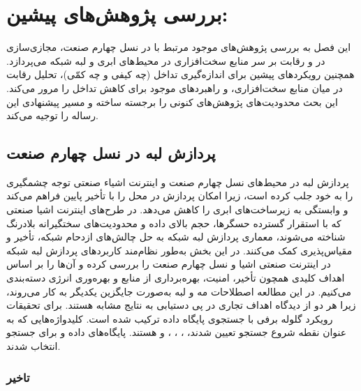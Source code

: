 
\chapter{بررسی پژوهش‌های پیشین:}\label{chap:litr}

این فصل به بررسی پژوهش‌های موجود مرتبط با  در نسل چهارم صنعت، مجازی‌سازی در  و رقابت بر سر منابع سخت‌افزاری در محیط‌های ابری و لبه‌ شبکه می‌پردازد. همچنین رویکردهای پیشین برای اندازه‌گیری تداخل (چه کیفی و چه کمّی)، تحلیل رقابت در میان منابع سخت‌افزاری، و راهبردهای موجود برای کاهش تداخل را مرور می‌کند. این بحث محدودیت‌های پژوهش‌های کنونی را برجسته ساخته و مسیر پیشنهادی این رساله را توجیه می‌کند.

\section{پردازش لبه در نسل چهارم صنعت}

پردازش لبه در محیط‌های نسل چهارم صنعت و اینترنت اشیاء صنعتی توجه چشمگیری را به خود جلب کرده است، زیرا امکان پردازش در محل را با تأخیر پایین فراهم می‌کند و وابستگی به زیرساخت‌های ابری را کاهش می‌دهد. در طرح‌های اینترنت اشیا صنعتی که با استقرار گسترده حسگرها، حجم بالای داده و محدودیت‌های سختگیرانه بلادرنگ شناخته می‌شوند، معماری پردازش لبه شبکه به حل چالش‌های ازدحام شبکه، تأخیر و مقیاس‌پذیری کمک می‌کنند. در این بخش به‌طور نظام‌مند کاربردهای پردازش لبه شبکه در اینترنت صنعتی اشیا و نسل چهارم صنعت را بررسی کرده و آن‌ها را بر اساس اهداف کلیدی همچون تأخیر، امنیت، بهره‌برداری از منابع و بهره‌وری انرژی دسته‌بندی می‌کنیم. در این مطالعه اصطلاحات مه  و لبه  به‌صورت جایگزین یکدیگر به کار می‌روند، زیرا هر دو از دیدگاه اهداف تجاری در پی دستیابی به نتایج مشابه هستند. برای تحقیقات رویکرد گلوله برفی با جستجوی پایگاه داده ترکیب شده است. کلیدواژه‌هایی که به عنوان نقطه شروع جستجو تعیین شدند، ، ، ،  و  هستند. پایگاه‌های داده  و  برای جستجو انتخاب شدند.

\subsection{تاخیر}

